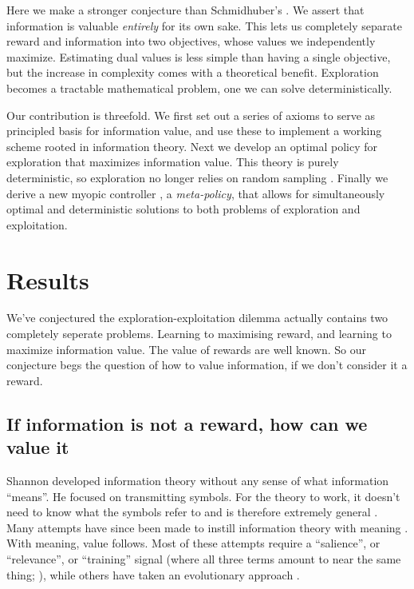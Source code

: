 \documentclass[9pt,twocolumn,twoside]{pnas-new}
\begin{document}
Here we make a stronger conjecture than Schmidhuber's \cite{Schmidhuber1991}. We assert that information is valuable \textit{entirely} for its own sake. This lets us completely separate reward and information into two objectives, whose values we independently maximize. Estimating dual values is less simple than having a single objective, but the increase in complexity comes with a theoretical benefit. Exploration becomes a tractable mathematical problem, one we can solve deterministically.

Our contribution is threefold. We first set out a series of axioms to serve as principled basis for information value, and use these to implement a working scheme rooted in information theory. Next we develop an optimal policy for exploration that maximizes information value. This theory is purely deterministic, so exploration no longer relies on random sampling \cite{Haarnojaa,Kakade2002,Pathak2017,Sutton1990,thrun1992active,dayan1996exploration}. Finally we derive a new myopic controller \cite{Hocker2017}, a \textit{meta-policy}, that allows for simultaneously optimal and deterministic solutions to both problems of exploration and exploitation. 


\section*{Results}
We've conjectured the exploration-exploitation dilemma actually contains two completely seperate problems. Learning to maximising reward, and learning to maximize information value. The value of rewards are well known. So our conjecture begs the question of how to value information, if we don't consider it a reward.

\subsection*{If information is not a reward, how can we value it}
Shannon developed information theory without any sense of what information ``means''. He focused on transmitting symbols. For the theory to work, it doesn't need to know what the symbols refer to and is therefore extremely general \citep{Shannon1948}. Many attempts have since been made to instill information theory with meaning \citep{Kolchinsky2018}. With meaning, value follows. Most of these attempts require a ``salience'', or ``relevance'', or ``training'' signal (where all three terms amount to near the same thing; \cite{Deacon2015,Tishby}), while others have taken an evolutionary approach \citep{Kolchinsky2018,Deacon2015}.  
\end{document}
